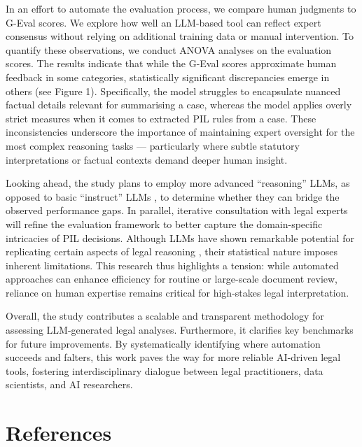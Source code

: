 \documentclass[a4paper,12pt]{article}
\begin{document}
In an effort to automate the evaluation process, we compare human judgments to G-Eval scores. We explore how well an LLM-based tool can reflect expert consensus without relying on additional training data or manual intervention. To quantify these observations, we conduct ANOVA analyses on the evaluation scores. The results indicate that while the G-Eval scores approximate human feedback in some categories, statistically significant discrepancies emerge in others (see Figure 1). Specifically, the model struggles to encapsulate nuanced factual details relevant for summarising a case, whereas the model applies overly strict measures when it comes to extracted PIL rules from a case. These inconsistencies underscore the importance of maintaining expert oversight for the most complex reasoning tasks — particularly where subtle statutory interpretations or factual contexts demand deeper human insight.

Looking ahead, the study plans to employ more advanced ``reasoning” LLMs, as opposed to basic ``instruct” LLMs \parencite[p.~22]{alammar_hands_large_2024}, to determine whether they can bridge the observed performance gaps. In parallel, iterative consultation with legal experts will refine the evaluation framework to better capture the domain-specific intricacies of PIL decisions. Although LLMs have shown remarkable potential for replicating certain aspects of legal reasoning \parencite{anon_2025, spaic_2024_14222584}, their statistical nature imposes inherent limitations. This research thus highlights a tension: while automated approaches can enhance efficiency for routine or large-scale document review, reliance on human expertise remains critical for high-stakes legal interpretation.

Overall, the study contributes a scalable and transparent methodology for assessing LLM-generated legal analyses. Furthermore, it clarifies key benchmarks for future improvements. By systematically identifying where automation succeeds and falters, this work paves the way for more reliable AI-driven legal tools, fostering interdisciplinary dialogue between legal practitioners, data scientists, and AI researchers.

\section*{References}
\printbibliography[heading=empty]

\newpage
\end{document}
